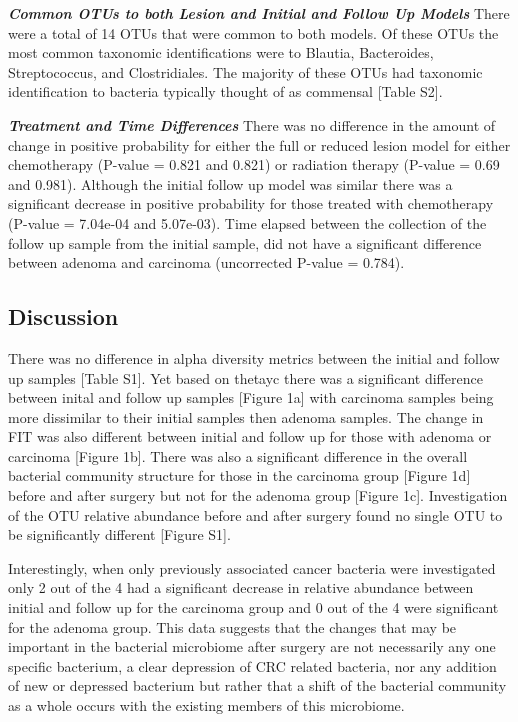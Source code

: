 \documentclass[12pt,]{article}
\begin{document}
\textbf{\emph{Common OTUs to both Lesion and Initial and Follow Up
Models}} There were a total of 14 OTUs that were common to both models.
Of these OTUs the most common taxonomic identifications were to Blautia,
Bacteroides, Streptococcus, and Clostridiales. The majority of these
OTUs had taxonomic identification to bacteria typically thought of as
commensal {[}Table S2{]}.

\textbf{\emph{Treatment and Time Differences}} There was no difference
in the amount of change in positive probability for either the full or
reduced lesion model for either chemotherapy (P-value = 0.821 and 0.821)
or radiation therapy (P-value = 0.69 and 0.981). Although the initial
follow up model was similar there was a significant decrease in positive
probability for those treated with chemotherapy (P-value = 7.04e-04 and
5.07e-03). Time elapsed between the collection of the follow up sample
from the initial sample, did not have a significant difference between
adenoma and carcinoma (uncorrected P-value = 0.784).

\newpage

\subsection{Discussion}\label{discussion}

There was no difference in alpha diversity metrics between the initial
and follow up samples {[}Table S1{]}. Yet based on thetayc there was a
significant difference between inital and follow up samples {[}Figure
1a{]} with carcinoma samples being more dissimilar to their initial
samples then adenoma samples. The change in FIT was also different
between initial and follow up for those with adenoma or carcinoma
{[}Figure 1b{]}. There was also a significant difference in the overall
bacterial community structure for those in the carcinoma group {[}Figure
1d{]} before and after surgery but not for the adenoma group {[}Figure
1c{]}. Investigation of the OTU relative abundance before and after
surgery found no single OTU to be significantly different {[}Figure
S1{]}.

Interestingly, when only previously associated cancer bacteria were
investigated only 2 out of the 4 had a significant decrease in relative
abundance between initial and follow up for the carcinoma group and 0
out of the 4 were significant for the adenoma group. This data suggests
that the changes that may be important in the bacterial microbiome after
surgery are not necessarily any one specific bacterium, a clear
depression of CRC related bacteria, nor any addition of new or depressed
bacterium but rather that a shift of the bacterial community as a whole
occurs with the existing members of this microbiome.
\end{document}
